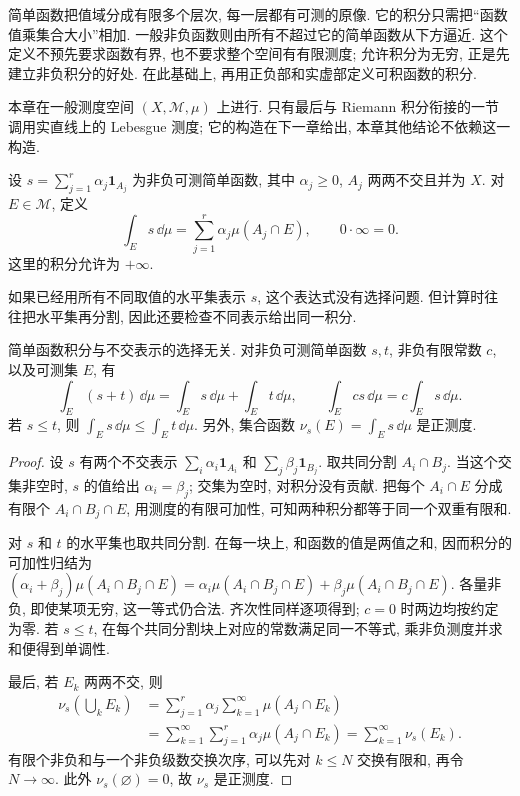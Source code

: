 
简单函数把值域分成有限多个层次, 每一层都有可测的原像. 它的积分只需把``函数值乘集合大小''相加. 一般非负函数则由所有不超过它的简单函数从下方逼近. 这个定义不预先要求函数有界, 也不要求整个空间有有限测度; 允许积分为无穷, 正是先建立非负积分的好处. 在此基础上, 再用正负部和实虚部定义可积函数的积分.

本章在一般测度空间 $(X,\mathcal M,\mu)$ 上进行. 只有最后与 Riemann 积分衔接的一节调用实直线上的 Lebesgue 测度; 它的构造在下一章给出, 本章其他结论不依赖这一构造.

\begin{definition}\label{ra:c2:simple-integral}
设 $s=\sum_{j=1}^{r}\alpha_j\mathbf1_{A_j}$ 为非负可测简单函数, 其中 $\alpha_j\ge0$, $A_j$ 两两不交且并为 $X$. 对 $E\in\mathcal M$, 定义
\[
 \int_E s\,\dd\mu=\sum_{j=1}^{r}\alpha_j\mu(A_j\cap E),
 \qquad 0\cdot\infty=0.
\]
这里的积分允许为 $+\infty$.
\end{definition}
如果已经用所有不同取值的水平集表示 $s$, 这个表达式没有选择问题. 但计算时往往把水平集再分割, 因此还要检查不同表示给出同一积分.

\begin{proposition}\label{ra:c2:simple-properties}
简单函数积分与不交表示的选择无关. 对非负可测简单函数 $s,t$, 非负有限常数 $c$, 以及可测集 $E$, 有
\[
 \int_E(s+t)\,\dd\mu=\int_Es\,\dd\mu+\int_Et\,\dd\mu,
 \qquad \int_Ecs\,\dd\mu=c\int_Es\,\dd\mu.
\]
若 $s\le t$, 则 $\int_Es\,\dd\mu\le\int_Et\,\dd\mu$. 另外, 集合函数 $\nu_s(E)=\int_Es\,\dd\mu$ 是正测度.
\end{proposition}
\begin{proof}
设 $s$ 有两个不交表示 $\sum_i\alpha_i\mathbf1_{A_i}$ 和 $\sum_j\beta_j\mathbf1_{B_j}$. 取共同分割 $A_i\cap B_j$. 当这个交集非空时, $s$ 的值给出 $\alpha_i=\beta_j$; 交集为空时, 对积分没有贡献. 把每个 $A_i\cap E$ 分成有限个 $A_i\cap B_j\cap E$, 用测度的有限可加性, 可知两种积分都等于同一个双重有限和.

对 $s$ 和 $t$ 的水平集也取共同分割. 在每一块上, 和函数的值是两值之和, 因而积分的可加性归结为 $(\alpha_i+\beta_j)\mu(A_i\cap B_j\cap E)=\alpha_i\mu(A_i\cap B_j\cap E)+\beta_j\mu(A_i\cap B_j\cap E)$. 各量非负, 即使某项无穷, 这一等式仍合法. 齐次性同样逐项得到; $c=0$ 时两边均按约定为零. 若 $s\le t$, 在每个共同分割块上对应的常数满足同一不等式, 乘非负测度并求和便得到单调性.

最后, 若 $E_k$ 两两不交, 则
\begin{align*}
 \nu_s\left(\bigcup_k E_k\right)
 &=\sum_{j=1}^{r}\alpha_j\sum_{k=1}^{\infty}\mu(A_j\cap E_k)\\
 &=\sum_{k=1}^{\infty}\sum_{j=1}^{r}\alpha_j\mu(A_j\cap E_k)
 =\sum_{k=1}^{\infty}\nu_s(E_k).
\end{align*}
有限个非负和与一个非负级数交换次序, 可以先对 $k\le N$ 交换有限和, 再令 $N\to\infty$. 此外 $\nu_s(\varnothing)=0$, 故 $\nu_s$ 是正测度.
\end{proof}

